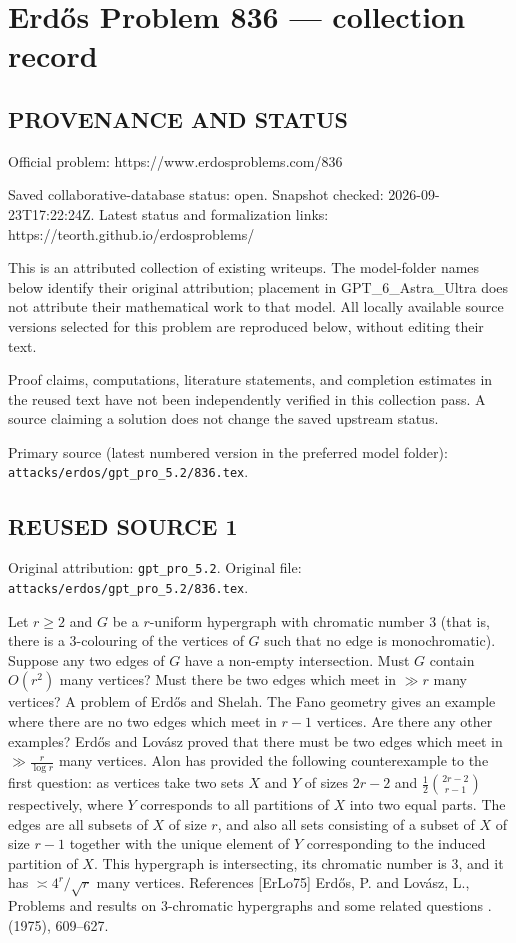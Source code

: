 \section*{Erd\H{o}s Problem 836 --- collection record}

\subsection*{PROVENANCE AND STATUS}
Official problem: https://www.erdosproblems.com/836

Saved collaborative-database status: open.
Snapshot checked: 2026-09-23T17:22:24Z.
Latest status and formalization links: https://teorth.github.io/erdosproblems/

This is an attributed collection of existing writeups. The model-folder names below identify their original attribution; placement in GPT\_6\_Astra\_Ultra does not attribute their mathematical work to that model. All locally available source versions selected for this problem are reproduced below, without editing their text.

Proof claims, computations, literature statements, and completion estimates in the reused text have not been independently verified in this collection pass. A source claiming a solution does not change the saved upstream status.

Primary source (latest numbered version in the preferred model folder): \texttt{attacks/erdos/gpt\_pro\_5.2/836.tex}.

\subsection*{REUSED SOURCE 1}
Original attribution: \texttt{gpt\_pro\_5.2}.
Original file: \texttt{attacks/erdos/gpt\_pro\_5.2/836.tex}.



Let $r\geq 2$ and $G$ be a $r$-uniform hypergraph with chromatic number $3$ (that is, there is a $3$-colouring of the vertices of $G$ such that no edge is monochromatic). Suppose any two edges of $G$ have a non-empty intersection. Must $G$ contain $O(r^2)$ many vertices? Must there be two edges which meet in $\gg r$ many vertices? A problem of Erd\H{o}s and Shelah. The Fano geometry gives an example where there are no two edges which meet in $r-1$ vertices. Are there any other examples? Erd\H{o}s and Lov\'{a}sz \cite{ErLo75} proved that there must be two edges which meet in $\gg \frac{r}{\log r}$ many vertices. Alon has provided the following counterexample to the first question: as vertices take two sets $X$ and $Y$ of sizes $2r-2$ and $\frac{1}{2}\binom{2r-2}{r-1}$ respectively, where $Y$ corresponds to all partitions of $X$ into two equal parts. The edges are all subsets of $X$ of size $r$, and also all sets consisting of a subset of $X$ of size $r-1$ together with the unique element of $Y$ corresponding to the induced partition of $X$. This hypergraph is intersecting, its chromatic number is $3$, and it has $\asymp 4^r/\sqrt{r}$ many vertices. References [ErLo75] Erd\H{o}s, P. and Lov\'{a}sz, L., Problems and results on {$3$}-chromatic hypergraphs and some related questions . (1975), 609--627.

